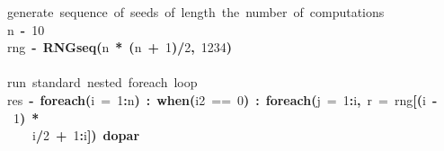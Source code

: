 \documentclass[a4paper,12pt]{article}\usepackage{graphicx, color}
\makeatletter
\newcommand{\hlnumber}[1]{\textcolor[rgb]{0,0,0}{#1}}%
\newcommand{\hlfunctioncall}[1]{\textcolor[rgb]{0.501960784313725,0,0.329411764705882}{\textbf{#1}}}%
\newcommand{\hlkeyword}[1]{\textcolor[rgb]{0,0,0}{\textbf{#1}}}%
\newcommand{\hlargument}[1]{\textcolor[rgb]{0.690196078431373,0.250980392156863,0.0196078431372549}{#1}}%
\newcommand{\hlcomment}[1]{\textcolor[rgb]{0.180392156862745,0.6,0.341176470588235}{#1}}%
\newcommand{\hlassignement}[1]{\textcolor[rgb]{0,0,0}{\textbf{#1}}}%
\newcommand{\hlsymbol}[1]{\textcolor[rgb]{0,0,0}{#1}}%
\newcommand{\hlstd}[1]{\textcolor[rgb]{0,0,0}{#1}}%
\newenvironment{kframe}{%
 \def\FrameCommand##1{\hskip\@totalleftmargin \hskip-\fboxsep
 \colorbox{shadecolor}{##1}\hskip-\fboxsep
     \hskip-\linewidth \hskip-\@totalleftmargin \hskip\columnwidth}%
 \MakeFramed {\advance\hsize-\width
   \@totalleftmargin\z@ \linewidth\hsize
   \@setminipage}}%
 {\par\unskip\endMakeFramed}
\newenvironment{knitrout}{}{} %
\renewenvironment{knitrout}{\begin{footnotesize}}{\end{footnotesize}}
\makeatother
\begin{document}
\begin{knitrout}
\color{fgcolor}\begin{kframe}
\begin{flushleft}
\ttfamily\noindent
\hlcomment{\usebox{\hlnormalsizeboxhash}{\ }generate{\ }sequence{\ }of{\ }seeds{\ }of{\ }length{\ }the{\ }number{\ }of{\ }computations}\hspace*{\fill}\\
\hlstd{}\hlsymbol{n}{\ }\hlassignement{\usebox{\hlnormalsizeboxlessthan}-}{\ }\hlnumber{10}\hspace*{\fill}\\
\hlstd{}\hlsymbol{rng}{\ }\hlassignement{\usebox{\hlnormalsizeboxlessthan}-}{\ }\hlfunctioncall{RNGseq}\hlkeyword{(}\hlsymbol{n}{\ }\hlkeyword{*}{\ }\hlkeyword{(}\hlsymbol{n}{\ }\hlkeyword{+}{\ }\hlnumber{1}\hlkeyword{)}\hlkeyword{/}\hlnumber{2}\hlkeyword{,}{\ }\hlnumber{1234}\hlkeyword{)}\hspace*{\fill}\\
\hlstd{}\hspace*{\fill}\\
\hlstd{}\hlcomment{\usebox{\hlnormalsizeboxhash}{\ }run{\ }standard{\ }nested{\ }foreach{\ }loop}\hspace*{\fill}\\
\hlstd{}\hlsymbol{res}{\ }\hlassignement{\usebox{\hlnormalsizeboxlessthan}-}{\ }\hlfunctioncall{foreach}\hlkeyword{(}\hlargument{i}{\ }\hlargument{=}{\ }\hlnumber{1}\hlkeyword{:}\hlsymbol{n}\hlkeyword{)}{\ }\hlkeyword{\usebox{\hlnormalsizeboxpercent}:\usebox{\hlnormalsizeboxpercent}}{\ }\hlfunctioncall{when}\hlkeyword{(}\hlsymbol{i}\hlkeyword{\usebox{\hlnormalsizeboxpercent}\usebox{\hlnormalsizeboxpercent}}\hlnumber{2}{\ }=={\ }\hlnumber{0}\hlkeyword{)}{\ }\hlkeyword{\usebox{\hlnormalsizeboxpercent}:\usebox{\hlnormalsizeboxpercent}}{\ }\hlfunctioncall{foreach}\hlkeyword{(}\hlargument{j}{\ }\hlargument{=}{\ }\hlnumber{1}\hlkeyword{:}\hlsymbol{i}\hlkeyword{,}{\ }\hlargument{r}{\ }\hlargument{=}{\ }\hlsymbol{rng}\hlkeyword{[}\hlkeyword{(}\hlsymbol{i}{\ }\hlkeyword{-}{\ }\hlnumber{1}\hlkeyword{)}{\ }\hlkeyword{*}\hspace*{\fill}\\
\hlstd{}{\ }{\ }{\ }{\ }\hlsymbol{i}\hlkeyword{/}\hlnumber{2}{\ }\hlkeyword{+}{\ }\hlnumber{1}\hlkeyword{:}\hlsymbol{i}\hlkeyword{]}\hlkeyword{)}{\ }\hlkeyword{\usebox{\hlnormalsizeboxpercent}dopar\usebox{\hlnormalsizeboxpercent}}{\ }\hlkeyword{\usebox{\hlnormalsizeboxopenbrace}}\hspace*{\fill}\\

\end{flushleft}
\end{kframe}
\end{knitrout}
\end{document}

